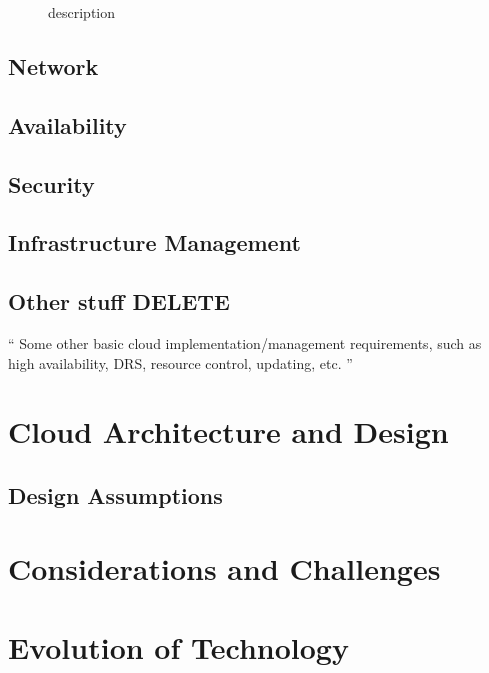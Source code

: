 \documentclass[]{article}
\begin{document}
\begin{description}
    \item[] description
\end{description}

\subsection{Network}

\subsection{Availability}

\subsection{Security}

\subsection{Infrastructure Management}

\subsection{Other stuff DELETE}
`` Some other basic cloud implementation/management requirements, such as high availability, DRS,
resource control, updating, etc. ''

\section{Cloud Architecture and Design}

\subsection{Design Assumptions}

\section{Considerations and Challenges}

\section{Evolution of Technology}
\end{document}
